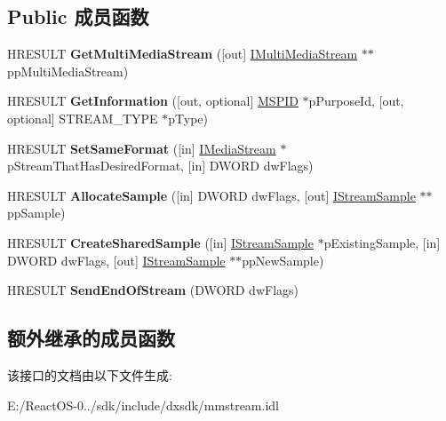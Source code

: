 \subsection*{Public 成员函数}
\begin{DoxyCompactItemize}
\item 
\mbox{\label{interface_i_media_stream_ac83ea87579193f2187dd1349d6965459}} 
H\+R\+E\+S\+U\+LT {\bfseries Get\+Multi\+Media\+Stream} (\mbox{[}out\mbox{]} \hyperlink{interface_i_multi_media_stream}{I\+Multi\+Media\+Stream} $\ast$$\ast$pp\+Multi\+Media\+Stream)
\item 
\mbox{\label{interface_i_media_stream_ab46714b923b96cc9d2e803c3e9f4dab8}} 
H\+R\+E\+S\+U\+LT {\bfseries Get\+Information} (\mbox{[}out, optional\mbox{]} \hyperlink{interface_g_u_i_d}{M\+S\+P\+ID} $\ast$p\+Purpose\+Id, \mbox{[}out, optional\mbox{]} S\+T\+R\+E\+A\+M\+\_\+\+T\+Y\+PE $\ast$p\+Type)
\item 
\mbox{\label{interface_i_media_stream_ab533957d1da93711bc5fc71e0c970021}} 
H\+R\+E\+S\+U\+LT {\bfseries Set\+Same\+Format} (\mbox{[}in\mbox{]} \hyperlink{interface_i_media_stream}{I\+Media\+Stream} $\ast$p\+Stream\+That\+Has\+Desired\+Format, \mbox{[}in\mbox{]} D\+W\+O\+RD dw\+Flags)
\item 
\mbox{\label{interface_i_media_stream_ac7fa0787db3be3845bf922b04d2305fb}} 
H\+R\+E\+S\+U\+LT {\bfseries Allocate\+Sample} (\mbox{[}in\mbox{]} D\+W\+O\+RD dw\+Flags, \mbox{[}out\mbox{]} \hyperlink{interface_i_stream_sample}{I\+Stream\+Sample} $\ast$$\ast$pp\+Sample)
\item 
\mbox{\label{interface_i_media_stream_abfd78aead217753d19dd064c4bbe00a9}} 
H\+R\+E\+S\+U\+LT {\bfseries Create\+Shared\+Sample} (\mbox{[}in\mbox{]} \hyperlink{interface_i_stream_sample}{I\+Stream\+Sample} $\ast$p\+Existing\+Sample, \mbox{[}in\mbox{]} D\+W\+O\+RD dw\+Flags, \mbox{[}out\mbox{]} \hyperlink{interface_i_stream_sample}{I\+Stream\+Sample} $\ast$$\ast$pp\+New\+Sample)
\item 
\mbox{\label{interface_i_media_stream_accd7aa148fa35ce22a25ec32d1b8eab9}} 
H\+R\+E\+S\+U\+LT {\bfseries Send\+End\+Of\+Stream} (D\+W\+O\+RD dw\+Flags)
\end{DoxyCompactItemize}
\subsection*{额外继承的成员函数}


该接口的文档由以下文件生成\+:\begin{DoxyCompactItemize}
\item 
E\+:/\+React\+O\+S-\/0../sdk/include/dxsdk/mmstream.\+idl\end{DoxyCompactItemize}
